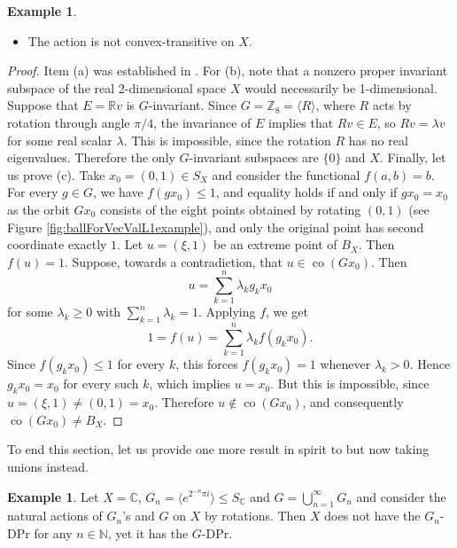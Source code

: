 \documentclass[a4paper,12pt]{amsart}
\theoremstyle{definition}
\theoremstyle{definition}
\newtheorem{example}[theorem]{Example}
\theoremstyle{remark}
\numberwithin{equation}{section}
\newcommand{\R}{\mathbb{R}}
\newcommand{\C}{\mathbb{C}}
\newcommand{\N}{\mathbb{N}}
\newcommand{\Z}{\mathbb{Z}}
\DeclareMathOperator{\co}{co}
\renewcommand{\geq}{\geqslant}
\renewcommand{\leq}{\leqslant}
\newcommand{\<}{\langle}
\renewcommand{\>}{\rangle}
\begin{document}
\begin{example}
\begin{itemize}
			\item[(c)] The action is not convex-transitive on $X$.
		\end{itemize}
		\begin{proof} Item (a) was established in . For (b), note that a nonzero proper invariant subspace of the real 2-dimensional space $X$ would necessarily be 1-dimensional. Suppose that $E=\R v$ is $G$-invariant. Since $G=\Z_8=\langle R\rangle$, where $R$ acts by rotation through angle $\pi/4$, the invariance of $E$ implies that $Rv\in E$, so $Rv=\lambda v$ for some real scalar $\lambda$. This is impossible, since the rotation $R$ has no real eigenvalues. Therefore the only $G$-invariant subspaces are $\{0\}$ and $X$. Finally, let us prove (c). Take $x_0=(0,1)\in S_X$ and consider the functional $f(a,b)=b$. For every $g\in G$, we have $f(gx_0)\leq 1$, and equality holds if and only if $gx_0=x_0$ as the orbit $Gx_0$ consists of the eight points obtained by rotating $(0,1)$ (see Figure \ref{fig:ballForVecValL1example}), and only the original point has second coordinate exactly $1$. Let $u=(\xi,1)$ be an extreme point of $B_X$. Then $f(u)=1$. Suppose, towards a contradiction, that $u\in \co(Gx_0)$. Then
			\begin{equation*}
				u=\sum_{k=1}^n \lambda_k g_kx_0
			\end{equation*}
			for some $\lambda_k\geq 0$ with $\sum_{k=1}^n \lambda_k=1$. Applying $f$, we get
			\begin{equation*}
				1=f(u)=\sum_{k=1}^n \lambda_k f(g_kx_0).
			\end{equation*}
			Since $f(g_kx_0)\leq 1$ for every $k$, this forces $f(g_kx_0)=1$ whenever $\lambda_k>0$. Hence $g_kx_0=x_0$ for every such $k$, which implies $u=x_0$. But this is impossible, since $u=(\xi,1)\neq (0,1)=x_0$. Therefore $u\notin \co(Gx_0)$, and consequently $\overline{\co}(Gx_0)\neq B_X$.
		\end{proof}
	\end{example}
	
	To end this section, let us provide one more result in spirit to  but now taking unions instead.
	\begin{example}
		Let $X = \C$, $G_n = \langle e^{2^{-n} \pi i}\rangle \le S_\C$ and $G = \bigcup_{n=1}^\infty G_n$ and consider the natural actions of $G_n$'s and $G$ on $X$ by rotations. Then $X$ does not have the $G_n$-DPr for any $n \in \N$, yet it has the $G$-DPr.
	\end{example}
	
\end{document}
